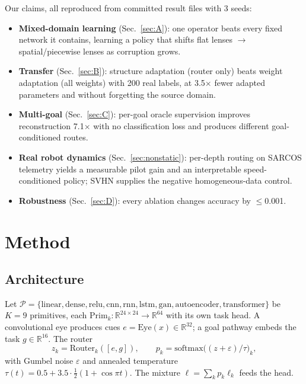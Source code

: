 \documentclass[conference,10pt]{IEEEtran}
\begin{document}
Our claims, all reproduced from committed result files with 3 seeds:
\begin{itemize}
\item \textbf{Mixed-domain learning} (Sec.~\ref{sec:A}): one operator beats every fixed network it contains, learning a policy that shifts flat lenses $\rightarrow$ spatial/piecewise lenses as corruption grows.
\item \textbf{Transfer} (Sec.~\ref{sec:B}): structure adaptation (router only) beats weight adaptation (all weights) with 200 real labels, at 3.5$\times$ fewer adapted parameters and without forgetting the source domain.
\item \textbf{Multi-goal} (Sec.~\ref{sec:C}): per-goal oracle supervision improves reconstruction 7.1$\times$ with no classification loss and produces different goal-conditioned routes.
\item \textbf{Real robot dynamics} (Sec.~\ref{sec:nonstatic}): per-depth routing on SARCOS telemetry yields a measurable pilot gain and an interpretable speed-conditioned policy; SVHN supplies the negative homogeneous-data control.
\item \textbf{Robustness} (Sec.~\ref{sec:D}): every ablation changes accuracy by $\le$0.001.
\end{itemize}

\section{Method}
\subsection{Architecture}
Let $\mathcal{P} = \{\text{linear}, \text{dense}, \text{relu}, \text{cnn}, \text{rnn}, \text{lstm}, \text{gan}, \text{autoencoder}, \text{transformer}\}$ be $K=9$ primitives, each $\text{Prim}_k: \mathbb{R}^{24\times24} \to \mathbb{R}^{64}$ with its own task head. A convolutional eye produces cues $e=\text{Eye}(x)\in\mathbb{R}^{32}$; a goal pathway embeds the task $g\in\mathbb{R}^{16}$. The router
\begin{equation}
z_k = \text{Router}_k([e,g]), \qquad p_k = \text{softmax}\big((z + \varepsilon)/\tau\big)_k,
\end{equation}
with Gumbel noise $\varepsilon$ and annealed temperature $\tau(t) = 0.5 + 3.5\cdot\frac12(1+\cos\pi t)$. The mixture $\ell=\sum_k p_k\ell_k$ feeds the head.
\end{document}
